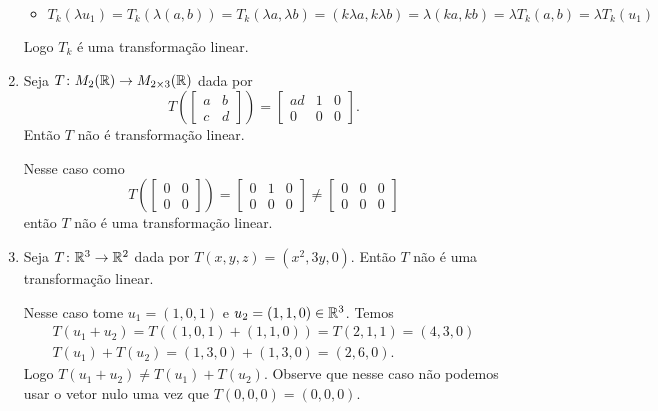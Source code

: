 \begin{exemplo}
\begin{enumerate}[label={\arabic*})]
\begin{solucao}
\begin{itemize}
            \vspace*{.3cm}

            \item $T_k(\lambda u_1) = T_k(\lambda (a, b)) = T_k(\lambda a, \lambda b) = (k\lambda a, k\lambda b) = \lambda(ka, kb) = \lambda T_k(a, b) = \lambda T_k(u_1)$
        \end{itemize}

        Logo $T_k$ é uma transformação linear.
    \end{solucao}

    \item Seja $T \colon M_2(\mathbb{R}) \to M_{2 \times 3}(\mathbb{R})$ dada por
    \[
        T\left(\begin{bmatrix}a & b\\c & d\end{bmatrix}\right) = \begin{bmatrix}ad & 1 & 0\\0 & 0 & 0\end{bmatrix}.
    \]
    Então $T$ não é transformação linear.
    \begin{solucao}
        Nesse caso como
        \[
            T\left(\begin{bmatrix}0 & 0\\0 & 0\end{bmatrix}\right) = \begin{bmatrix}0 & 1 & 0\\0 & 0 & 0\end{bmatrix} \ne \begin{bmatrix}0 & 0 & 0\\0 & 0 & 0\end{bmatrix}
        \]
        então $T$ não é uma transformação linear.
    \end{solucao}

    \item Seja $T \colon \mathbb{R}^3 \to \mathbb{R}^2$ dada por $T(x, y, z) = (x^2, 3y, 0)$. Então $T$ não é uma transformação linear.
    \begin{solucao}
        Nesse caso tome $u_1 = (1, 0, 1)$ e $u_2 = (1, 1, 0) \in \mathbb{R}^3$. Temos
        \begin{align*}
            T(u_1 + u_2) = T((1, 0, 1) + (1, 1, 0)) = T(2, 1, 1) = (4, 3, 0)\\
            T(u_1) + T(u_2) = (1, 3, 0) + (1, 3, 0) = (2, 6, 0).
        \end{align*}
        Logo $T(u_1 + u_2) \ne T(u_1) + T(u_2)$. Observe que nesse caso não podemos usar o vetor nulo uma vez que $T(0, 0, 0) = (0, 0, 0)$.
    \end{solucao}


\end{enumerate}
\end{exemplo}
